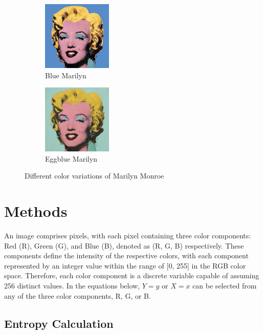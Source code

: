 \documentclass{article}
\begin{document}
\begin{figure}[ht]
  \begin{minipage}{0.6\textwidth}
    \centering
    \begin{subfigure}{0.45\textwidth}
      \centering
      \includegraphics[width=125px]{main_files/figure-latex/1_4_blue_marilyn.jpg}
      \caption{Blue Marilyn}
      \label{fig:1_4_blue_marilyn}
    \end{subfigure}
    \hfill
    \begin{subfigure}{0.45\textwidth}
      \centering
      \includegraphics[width=125px]{main_files/figure-latex/1_5_eggblue_marilyn.jpg}
      \caption{Eggblue Marilyn}
      \label{fig:1_5_eggblue_marilyn}
    \end{subfigure}
  \end{minipage}

  \caption{Different color variations of Marilyn Monroe}
  \label{fig:marilyn_variations}
\end{figure}

\hypertarget{methods}{%
\section{Methods}\label{methods}}

An image comprises pixels, with each pixel containing three color
components: Red (R), Green (G), and Blue (B), denoted as (R, G, B)
respectively. These components define the intensity of the respective
colors, with each component represented by an integer value within the
range of {[}0, 255{]} in the RGB color space. Therefore, each color
component is a discrete variable capable of assuming 256 distinct
values. In the equations below, \(Y=y\) or \(X=x\) can be selected from
any of the three color components, R, G, or B.

\hypertarget{entropy-calculation}{%
\subsection{Entropy Calculation}\label{entropy-calculation}}
\end{document}
